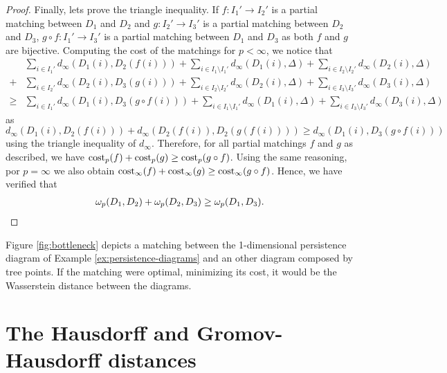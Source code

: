 \begin{proof}
    Finally, lets prove the triangle inequality. If $ f: I_1' \to I_2' $ is a partial matching between $ D_1 $ and $ D_2 $ and $ g: I_2' \to I_3' $ is a partial matching between $ D_2 $ and $ D_3 $, $ g \circ f: I_1' \to I_3' $ is a partial matching between $ D_1 $ and $ D_3 $ as both $ f $ and $ g $ are bijective. Computing the cost of the matchings for $ p < \infty$, we notice that
    \begin{align}
        &\sum_{i\in I_1'} d_\infty(D_1(i), D_2(f(i))) + \sum_{i\in I_1 \setminus I_1'} d_\infty(D_1(i), \Delta) + \sum_{i\in I_2 \setminus I_2'} d_\infty(D_2(i), \Delta) \\
        + &\sum_{i\in I_2'} d_\infty(D_2(i), D_3(g(i))) + \sum_{i\in I_2 \setminus I_2'} d_\infty(D_2(i), \Delta) + \sum_{i\in I_3 \setminus I_3'} d_\infty(D_3(i), \Delta) \\
        \geq &\sum_{i\in I_1'} d_\infty(D_1(i), D_3(g \circ f(i))) + \sum_{i\in I_1 \setminus I_1'} d_\infty(D_1(i), \Delta) + \sum_{i\in I_3 \setminus I_3'} d_\infty(D_3(i), \Delta)
    \end{align}
    as $ d_\infty(D_1(i), D_2(f(i))) + d_\infty(D_2(f(i)), D_2(g(f(i)))) \geq d_\infty(D_1(i), D_3(g \circ f(i))) $ using the triangle inequality of $ d_\infty $. Therefore, for all partial matchings $ f $ and $ g $ as described, we have $ \operatorname{cost}_p (f) + \operatorname{cost}_p (g) \geq \operatorname{cost}_p (g \circ f) $. Using the same reasoning, por $ p = \infty $ we also obtain $ \operatorname{cost}_\infty (f) + \operatorname{cost}_\infty (g) \geq \operatorname{cost}_\infty (g \circ f) $. Hence, we have verified that
    \begin{align}
        \omega_p(D_1, D_2) + \omega_p(D_2, D_3) \geq \omega_p(D_1, D_3).
    \end{align}
\end{proof}

\begin{example} \label{ex:wasserstein}
    Figure \ref{fig:bottleneck} depicts a matching between the 1-dimensional persistence diagram of Example \ref{ex:persistence-diagrams} and an other diagram composed by tree points. If the matching were optimal, minimizing its cost, it would be the Wasserstein distance between the diagrams.
    
\end{example}

\section{The Hausdorff and Gromov-Hausdorff distances} \label{sec:preliminaries-hausdorff}

